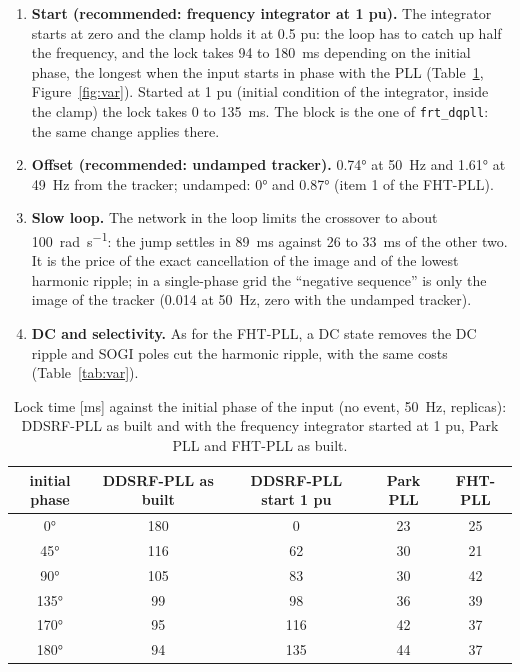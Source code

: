 \documentclass[11pt,a4paper]{scrartcl}
\newcommand{\code}[1]{\texttt{#1}}
\begin{document}
\begin{onehalfspace}
\begin{enumerate}
	\item \textbf{Start (recommended: frequency integrator at \num{1} pu).} The integrator starts at zero and the clamp holds it at \num{0.5} pu: the loop has to catch up half the frequency, and the lock takes \SI{94}{} to \SI{180}{\milli\second} depending on the initial phase, the longest when the input starts in phase with the PLL (Table~\ref{tab:lock}, Figure~\ref{fig:var}). Started at \num{1} pu (initial condition of the integrator, inside the clamp) the lock takes \SI{0}{} to \SI{135}{\milli\second}. The block is the one of \code{frt\_dqpll}: the same change applies there.
	\item \textbf{Offset (recommended: undamped tracker).} \ang{0.74} at \SI{50}{\hertz} and \ang{1.61} at \SI{49}{\hertz} from the tracker; undamped: \ang{0} and \ang{0.87} (item 1 of the FHT-PLL).
	\item \textbf{Slow loop.} The network in the loop limits the crossover to about \SI{100}{\radian\per\second}: the jump settles in \SI{89}{\milli\second} against \SI{26}{} to \SI{33}{\milli\second} of the other two. It is the price of the exact cancellation of the image and of the lowest harmonic ripple; in a single-phase grid the ``negative sequence'' is only the image of the tracker (\num{0.014} at \SI{50}{\hertz}, zero with the undamped tracker).
	\item \textbf{DC and selectivity.} As for the FHT-PLL, a DC state removes the DC ripple and SOGI poles cut the harmonic ripple, with the same costs (Table~\ref{tab:var}).
\end{enumerate}

\begin{table}[H]
	\centering
	\caption{Lock time [ms] against the initial phase of the input (no event, \SI{50}{\hertz}, replicas): DDSRF-PLL as built and with the frequency integrator started at \num{1} pu, Park PLL and FHT-PLL as built.}
	\label{tab:lock}
	\footnotesize
	\begin{tabular}{@{} c c c c c @{}}
		\toprule
		initial phase & DDSRF-PLL as built & DDSRF-PLL start \num{1} pu & Park PLL & FHT-PLL \\
		\midrule
		\ang{0} & 180 & 0 & 23 & 25 \\
		\ang{45} & 116 & 62 & 30 & 21 \\
		\ang{90} & 105 & 83 & 30 & 42 \\
		\ang{135} & 99 & 98 & 36 & 39 \\
		\ang{170} & 95 & 116 & 42 & 37 \\
		\ang{180} & 94 & 135 & 44 & 37 \\
		\bottomrule
	\end{tabular}
\end{table}


\end{onehalfspace}
\end{document}
